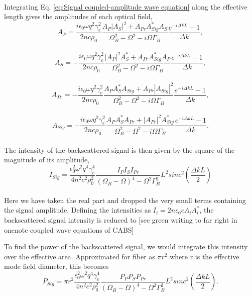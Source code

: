 \documentclass[sn-nature]{sn-jnl}%
\begin{document}
\\
Integrating Eq. \ref{eq:Signal coupled-amplitude wave equation} along the effective length gives the amplitudes of each optical field,
\\
\begin{equation}
  A_{P} = \frac{i\epsilon_{0}\omega q^{2}\gamma_{e}^{2}}{2nc\rho_{0}}\frac{A_{P}|A_{S}|^{2} + A_{Pr}A_{Sig}^{*}A_{S}}{\Omega_{B}^{2}-\Omega^{2}-i\Omega\Gamma_{B}} \frac{e^{-i\Delta kL}-1}{\Delta k},
\end{equation}
\\
\begin{equation}
  A_{S} = -\frac{i\epsilon_{0}\omega q^{2}\gamma_{e}^{2}}{2nc\rho_{0}}\frac{|A_{P}|^{2}A_{S}^{*} + A_{Pr}A_{Sig}^{*}A_{P}}{\Omega_{B}^{2}-\Omega^{2}-i\Omega\Gamma_{B}} \frac{e^{-i\Delta kL}-1}{\Delta k},
\end{equation}
\\
\begin{equation}
  A_{Pr} = -\frac{i\epsilon_{0}\omega q^{2}\gamma_{e}^{2}}{2nc\rho_{0}}\frac{A_{P}A_{S}^{*}A_{Sig} + A_{Pr}|A_{Sig}|^{2}}{\Omega_{B}^{2}-\Omega^{2}-i\Omega\Gamma_{B}} \frac{e^{-i\Delta kL}-1}{\Delta k},
\end{equation}
\\
\begin{equation}
  A_{Sig} = -\frac{i\epsilon_{0}\omega q^{2}\gamma_{e}^{2}}{2nc\rho_{0}}\frac{A_{P}A_{S}^{*}A_{Pr} + |A_{Pr}|^{2}A_{Sig}^{*}}{\Omega_{B}^{2}-\Omega^{2}-i\Omega\Gamma_{B}} \frac{e^{-i\Delta kL}-1}{\Delta k}.
\end{equation}
\\
The intensity of the backscattered signal is then given by the square of the magnitude of its amplitude,
\\
\begin{equation}
  I_{Sig} = \frac{\epsilon_{0}^{2}\omega^{2}q^{4}\gamma_{e}^{4}}{4n^{2}c^{2}\rho_{0}^{2}}\frac{I_{P}I_{S}I_{Pr}}{(\Omega_{B} - \Omega)^{4} - \Omega^{2}\Gamma_{B}^{2}}L^{2}sinc^{2}\left(\frac{\Delta kL}{2}\right)
\end{equation}
\\
Here we have taken the real part and dropped the very small terms containing the signal amplitude. Defining the intensities as $I_{i} = 2n\epsilon_{0}cA_{i}A_{i}^{*}$, the backscattered signal intensity is reduced to [see green writing to far right in onenote coupled wave equations of CABS]

To find the power of the backscattered signal, we would integrate this intensity over the effective area. Approximated for fiber as $\pi r^{2}$ where r is the effective mode field diameter, this becomes
\\
\begin{equation}
  P_{Sig} = \pi r^{2}\frac{\epsilon_{0}^{2}\omega^{2}q^{4}\gamma_{e}^{4}}{4n^{2}c^{2}\rho_{0}^{2}}\frac{P_{P}P_{S}P_{Pr}}{(\Omega_{B} - \Omega)^{4} - \Omega^{2}\Gamma_{B}^{2}}L^{2}sinc^{2}\left(\frac{\Delta kL}{2}\right).
\end{equation}





%
\end{document}
